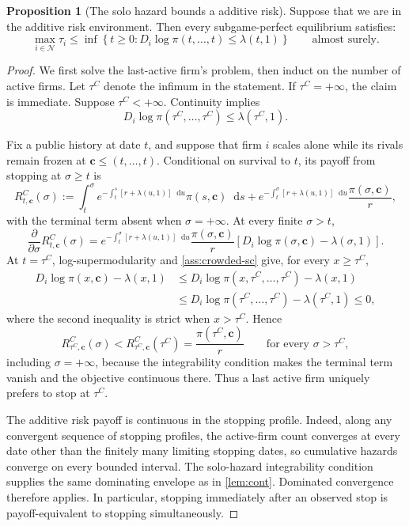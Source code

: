 \documentclass[12pt,reqno]{article}
\newcommand{\de}{\mathop{}\!\mathrm{d}}
\theoremstyle{definition} \newtheorem{example}{Example}
\theoremstyle{definition} \newtheorem{condition}{Condition}
\theoremstyle{definition} \newtheorem{corollary}{Corollary}
\theoremstyle{definition} \newtheorem{claim}{Claim}
\theoremstyle{definition} \newtheorem{definition}{Definition}
\theoremstyle{definition} \newtheorem{conjecture}{Conjecture}
\theoremstyle{definition} \newtheorem{Lemma}{Lemma}
\theoremstyle{definition} \newtheorem{lemma}{Lemma}
\theoremstyle{plain} \newtheorem{theorem}{Theorem}
\theoremstyle{definition} \newtheorem{assumption}{Assumption}
\theoremstyle{definition} \newtheorem*{assumptionnonumber}{Assumption}
\theoremstyle{definition} \newtheorem*{theoremNoNumber}{Proposition}
\theoremstyle{definition}
\theoremstyle{definition}\newtheorem{proposition}{Proposition}
\theoremstyle{definition} \newtheorem{result}{Result}
\theoremstyle{definition} \newtheorem*{definitionNoNumber}{Definition}
\theoremstyle{definition} \newtheorem{Definition}{Definition}
\theoremstyle{definition} \newtheorem*{DefinitionNoNumber}{Definition}
\theoremstyle{definition} \newtheorem*{fact}{Fact}
\theoremstyle{definition} \newtheorem*{property}{Property}
\theoremstyle{definition} \newtheorem{remark}{Remark}
\begin{document}
\begin{proposition}[The solo hazard bounds a additive risk]
\label{prop:additive risk}
Suppose that we are in the additive risk environment. Then every subgame-perfect equilibrium satisfies:
\[
\max_{i\in\mathcal N}\tau_i
\leq
\inf\left\{
t\geq0:
D_i\log\pi(t,\ldots,t)\leq\lambda(t,1)
\right\}
\qquad\text{almost surely}. 
\]
\end{proposition}

\begin{proof}
We first solve the last-active firm's problem, then induct on the number of
active firms. Let $\tau^C$ denote the infimum in the statement. If
$\tau^C=+\infty$, the claim is immediate. Suppose $\tau^C<+\infty$.
Continuity implies
\[
D_i\log\pi(\tau^C,\ldots,\tau^C)\leq\lambda(\tau^C,1).
\]

Fix a public history at date $t$, and suppose that firm $i$ scales alone while
its rivals remain frozen at $\bm c\leq(t,\ldots,t)$. Conditional on survival
to $t$, its payoff from stopping at $\sigma\geq t$ is
\[
R^C_{t,\bm c}(\sigma)
:=
\int_t^\sigma
e^{-\int_t^s[r+\lambda(u,1)]\de u}\pi(s,\bm c)\de s
+
e^{-\int_t^\sigma[r+\lambda(u,1)]\de u}
\frac{\pi(\sigma,\bm c)}r,
\]
with the terminal term absent when $\sigma=+\infty$. At every finite
$\sigma>t$,
\[
\frac{\partial}{\partial\sigma}R^C_{t,\bm c}(\sigma)
=
e^{-\int_t^\sigma[r+\lambda(u,1)]\de u}
\frac{\pi(\sigma,\bm c)}r
\left[D_i\log\pi(\sigma,\bm c)-\lambda(\sigma,1)\right].
\]
At $t=\tau^C$, log-supermodularity and
\cref{ass:crowded-sc} give, for every $x\geq\tau^C$,
\begin{align*}
D_i\log\pi(x,\bm c)-\lambda(x,1)
&\leq
D_i\log\pi(x,\tau^C,\ldots,\tau^C)-\lambda(x,1)\\
&\leq
D_i\log\pi(\tau^C,\ldots,\tau^C)-\lambda(\tau^C,1)
\leq0,
\end{align*}
where the second inequality is strict when $x>\tau^C$. Hence
\[
R^C_{\tau^C,\bm c}(\sigma)
<R^C_{\tau^C,\bm c}(\tau^C)
=\frac{\pi(\tau^C,\bm c)}r
\qquad\text{for every }\sigma>\tau^C,
\]
including $\sigma=+\infty$, because the integrability condition makes the
terminal term vanish and the objective continuous there. Thus a last active
firm uniquely prefers to stop at $\tau^C$.

The additive risk payoff is continuous in the stopping profile. Indeed,
along any convergent sequence of stopping profiles, the active-firm count
converges at every date other than the finitely many limiting stopping dates,
so cumulative hazards converge on every bounded interval. The solo-hazard
integrability condition supplies the same dominating envelope as in
\cref{lem:cont}. Dominated convergence therefore applies. In particular,
stopping immediately after an observed stop is payoff-equivalent to stopping
simultaneously.


\end{proof}
\end{document}
